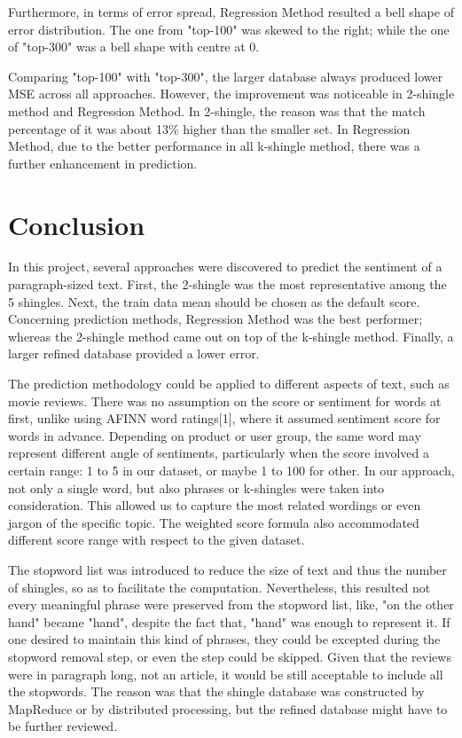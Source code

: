 Furthermore, in terms of error spread,  Regression Method resulted a bell shape of error distribution. The one from "top-100"  was skewed to the right; while the one of "top-300"  was a bell shape with centre at 0.

Comparing "top-100" with "top-300", the larger database always produced lower MSE across all approaches. However, the improvement was noticeable in 2-shingle method and Regression Method. In 2-shingle, the reason was that the match percentage of it was about 13\% higher than the smaller set. In Regression Method, due to the better performance in all k-shingle method, there was a further enhancement in prediction.


\section{Conclusion}

In this project, several approaches were discovered to predict the sentiment of a paragraph-sized text. First, the 2-shingle was the most representative among the 5 shingles. Next, the train data mean should be chosen as the default score. Concerning prediction methods, Regression Method was the best performer; whereas the 2-shingle method came out on top of the k-shingle method. Finally, a larger refined database provided a lower error.

The prediction methodology could be applied to different aspects of text, such as movie reviews. There was no assumption on the score or sentiment for words at first, unlike using AFINN word ratings[1], where it assumed sentiment score for words in advance. Depending on product or user group, the same word may represent different angle of sentiments, particularly when the score involved a certain range: 1 to 5 in our dataset, or maybe 1 to 100 for other. In our approach, not only a single word, but also phrases or k-shingles were taken into consideration. This allowed us to capture the most related wordings or even jargon of the specific topic. The weighted score formula also accommodated different score range with respect to the given dataset.

The stopword list was introduced to reduce the size of text and thus the number of shingles, so as to facilitate the computation. Nevertheless, this resulted not every meaningful phrase were preserved from the stopword list, like, "on the other hand" became "hand", despite the fact that, "hand" was enough to represent it. If one desired to maintain this kind of phrases, they could be excepted during the stopword removal step, or even the step could be skipped. Given that the reviews were in paragraph long, not an article, it would be still acceptable to include all the stopwords. The reason was that the shingle database was constructed by MapReduce or by distributed processing, but the refined database might have to be further reviewed.

